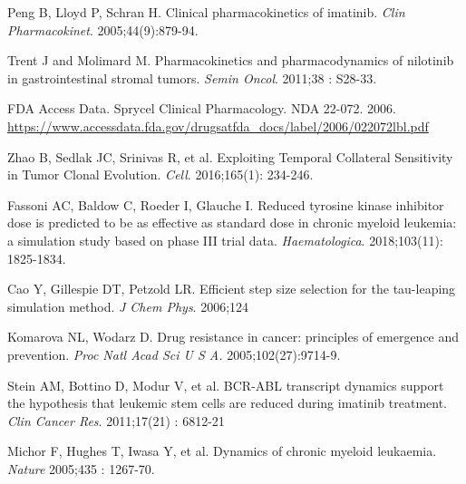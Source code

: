\documentclass{article}
\begin{document}
\begin{thebibliography}{9}

Peng B, Lloyd P, Schran H. Clinical pharmacokinetics of imatinib. \textit{Clin Pharmacokinet}. 2005;44(9):879-94.

Trent J and Molimard M. Pharmacokinetics and pharmacodynamics of nilotinib in gastrointestinal stromal tumors. \textit{Semin Oncol}. 2011;38 : S28-33.

FDA Access Data. Sprycel Clinical Pharmacology. NDA 22-072. 2006. \url{https://www.accessdata.fda.gov/drugsatfda_docs/label/2006/022072lbl.pdf}

Zhao B, Sedlak JC,  Srinivas R, et al. Exploiting Temporal Collateral Sensitivity in Tumor Clonal Evolution. \textit{Cell}. 2016;165(1): 234-246.

Fassoni AC, Baldow C, Roeder I, Glauche I. Reduced tyrosine kinase inhibitor dose is predicted to be as effective as standard dose in chronic myeloid leukemia: a simulation study based on phase III trial data. \textit{Haematologica}. 2018;103(11): 1825-1834.

Cao Y, Gillespie DT, Petzold LR. Efficient step size selection for the tau-leaping simulation method. \textit{J Chem Phys}. 2006;124

Komarova NL, Wodarz D. Drug resistance in cancer: principles of emergence and prevention. \textit{Proc Natl Acad Sci U S A.} 2005;102(27):9714-9.

Stein AM, Bottino D, Modur V, et al. BCR-ABL transcript dynamics support the hypothesis that leukemic stem cells are reduced during imatinib treatment. \textit{Clin Cancer Res}. 2011;17(21) : 6812-21

Michor F, Hughes T, Iwasa Y, et al. Dynamics of chronic myeloid leukaemia. \textit{Nature} 2005;435 : 1267-70.


\end{thebibliography}
\end{document}
